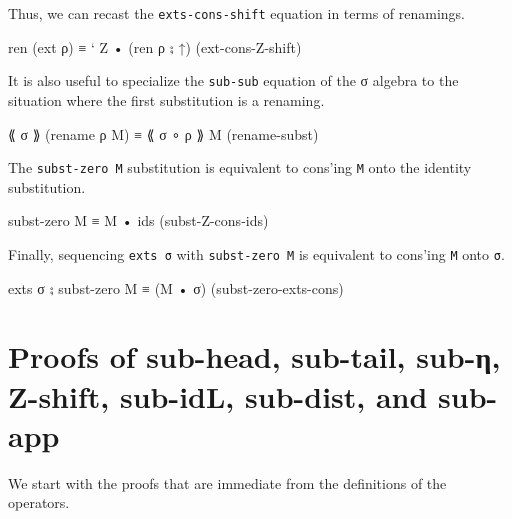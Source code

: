 Thus, we can recast the \texttt{exts-cons-shift} equation in terms of
renamings.

\begin{myDisplay}
ren (ext ρ) ≡ ` Z • (ren ρ ⨟ ↑)       (ext-cons-Z-shift)
\end{myDisplay}

It is also useful to specialize the \texttt{sub-sub} equation of the σ
algebra to the situation where the first substitution is a renaming.

\begin{myDisplay}
⟪ σ ⟫ (rename ρ M) ≡ ⟪ σ ∘ ρ ⟫ M       (rename-subst)
\end{myDisplay}

The \texttt{subst-zero\ M} substitution is equivalent to cons'ing
\texttt{M} onto the identity substitution.

\begin{myDisplay}
subst-zero M ≡ M • ids                (subst-Z-cons-ids)
\end{myDisplay}

Finally, sequencing \texttt{exts\ σ} with \texttt{subst-zero\ M} is
equivalent to cons'ing \texttt{M} onto \texttt{σ}.

\begin{myDisplay}
exts σ ⨟ subst-zero M ≡ (M • σ)       (subst-zero-exts-cons)
\end{myDisplay}

\hypertarget{proofs-of-sub-head-sub-tail-sub-ux3b7-z-shift-sub-idl-sub-dist-and-sub-app}{%
\section{Proofs of sub-head, sub-tail, sub-η, Z-shift, sub-idL,
sub-dist, and
sub-app}\label{proofs-of-sub-head-sub-tail-sub-ux3b7-z-shift-sub-idl-sub-dist-and-sub-app}}

We start with the proofs that are immediate from the definitions of the
operators.

